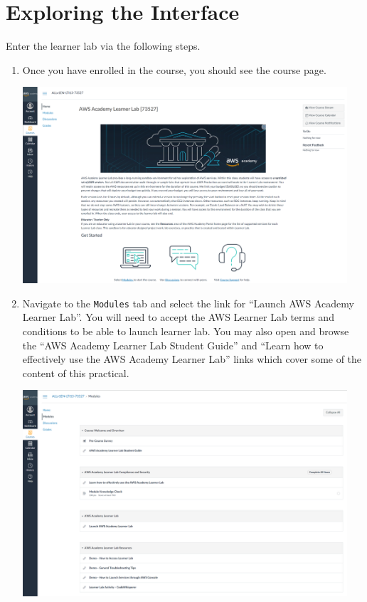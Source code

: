 \documentclass{csse4400}
\begin{document}
\section{Exploring the Interface}

Enter the learner lab via the following steps.

\begin{enumerate}

\item Once you have enrolled in the course, you should see the course page.

\includegraphics[trim=0 200 0 0,clip,width=0.95\textwidth]{images/academy-homepage}

\item Navigate to the \texttt{Modules} tab and select the link for ``Launch AWS Academy Learner Lab''.
        You will need to accept the AWS Learner Lab terms and conditions to be able to launch learner lab.
        You may also open and browse the ``AWS Academy Learner Lab Student Guide'' and
        ``Learn how to effectively use the AWS Academy Learner Lab'' links which cover some of the content of this practical.

\includegraphics[width=0.95\textwidth]{images/modules-page}


\end{enumerate}
\end{document}
